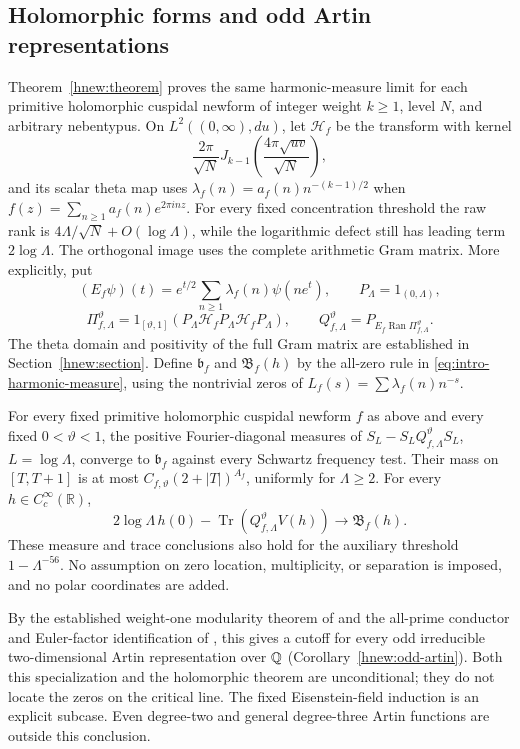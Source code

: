 \subsection{Holomorphic forms and odd Artin representations}
Theorem~\ref{hnew:theorem} proves the same harmonic-measure limit
for each primitive holomorphic cuspidal newform of integer weight
$k\ge1$, level $N$, and arbitrary nebentypus. On $L^2((0,\infty),du)$,
let $\mathcal H_f$ be the transform with kernel
\[
 \frac{2\pi}{\sqrt N}
 J_{k-1}\left(\frac{4\pi\sqrt{uv}}{\sqrt N}\right),
\]
and its scalar theta map uses
$\lambda_f(n)=a_f(n)n^{-(k-1)/2}$ when
$f(z)=\sum_{n\ge1}a_f(n)e^{2\pi inz}$.
For every fixed concentration threshold the raw rank is
$4\Lambda/\sqrt N+O(\log\Lambda)$, while the logarithmic defect
still has leading term $2\log\Lambda$. The orthogonal image uses
the complete arithmetic Gram matrix. More explicitly, put
\[
 (E_f\psi)(t)=e^{t/2}\sum_{n\ge1}\lambda_f(n)\psi(ne^t),
 \qquad P_\Lambda=1_{(0,\Lambda)},
\]
\[
 \Pi_{f,\Lambda}^{\vartheta}
 =1_{[\vartheta,1]}(P_\Lambda\mathcal H_fP_\Lambda\mathcal H_fP_\Lambda),
 \qquad Q_{f,\Lambda}^{\vartheta}
 =P_{E_f\operatorname{Ran}\Pi_{f,\Lambda}^{\vartheta}}.
\]
The theta domain and positivity of the full Gram matrix are established
in Section~\ref{hnew:section}. Define $\mathfrak b_f$ and
$\mathfrak B_f(h)$ by the all-zero rule in \eqref{eq:intro-harmonic-measure},
using the nontrivial zeros of $L_f(s)=\sum\lambda_f(n)n^{-s}$.

\begin{theorem}\label{thm:main-holomorphic}
For every fixed primitive holomorphic cuspidal newform $f$ as above
and every fixed $0<\vartheta<1$, the positive Fourier-diagonal measures
of $S_L-S_LQ_{f,\Lambda}^{\vartheta}S_L$, $L=\log\Lambda$,
converge to $\mathfrak b_f$ against every Schwartz frequency test.
Their mass on $[T,T+1]$ is at most
$C_{f,\vartheta}(2+|T|)^{A_f}$, uniformly for $\Lambda\ge2$.
For every $h\in C_c^\infty(\mathbb R)$,
\[
 2\log\Lambda\,h(0)
   -\operatorname{Tr}(Q_{f,\Lambda}^{\vartheta}V(h))
          \longrightarrow\mathfrak B_f(h).
\]
These measure and trace conclusions also hold for the auxiliary
threshold $1-\Lambda^{-56}$. No assumption on zero location, multiplicity,
or separation is imposed, and no polar coordinates are added.
\end{theorem}

By the established weight-one modularity theorem of
\citet[Corollary~10.2(ii), author-preprint p.~21]{kharewintenberger2009}
and the all-prime conductor and Euler-factor identification of
\citet[Theorem~4.6, p.~514]{deligneserre1974}, this gives a cutoff
for every odd irreducible two-dimensional Artin representation over
$\mathbb Q$ (Corollary~\ref{hnew:odd-artin}). Both this specialization and
the holomorphic theorem are unconditional; they do not locate the
zeros on the critical line. The fixed Eisenstein-field induction is
an explicit subcase. Even degree-two and general degree-three
Artin functions are outside this conclusion.

